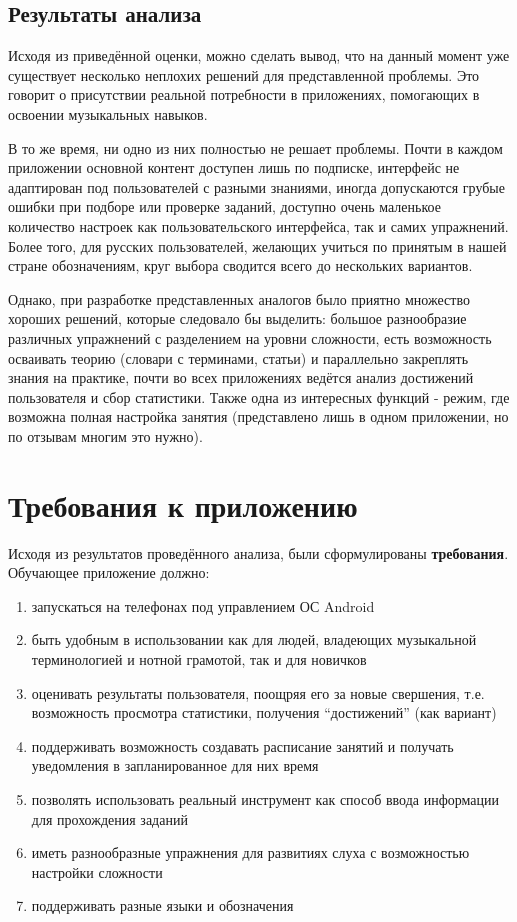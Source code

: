 \subsection{Результаты анализа}
Исходя из приведённой оценки, можно сделать вывод, что на данный момент уже существует несколько неплохих решений для представленной проблемы. Это говорит о присутствии реальной потребности в приложениях, помогающих в освоении музыкальных навыков.\par
В то же время, ни одно из них полностью не решает проблемы. Почти в каждом приложении основной контент доступен лишь по подписке, интерфейс не адаптирован под пользователей с разными знаниями, иногда допускаются грубые ошибки при подборе или проверке заданий, доступно очень маленькое количество настроек как пользовательского интерфейса, так и самих упражнений. Более того, для русских пользователей, желающих учиться по принятым в нашей стране обозначениям, круг выбора сводится всего до нескольких вариантов.\par
Однако, при разработке представленных аналогов было приятно множество хороших решений, которые следовало бы выделить: большое разнообразие различных упражнений с разделением на уровни сложности, есть возможность осваивать теорию (словари с терминами, статьи) и параллельно закреплять знания на практике, почти во всех приложениях ведётся анализ достижений пользователя и сбор статистики. Также одна из интересных функций - режим, где возможна полная настройка занятия (представлено лишь в одном приложении, но по отзывам многим это нужно).
\section{Требования к приложению}
Исходя из результатов проведённого анализа, были сформулированы \textbf{требования}. Обучающее приложение должно: 
\begin{enumerate}
\item запускаться на телефонах под управлением ОС Android
\item быть удобным в использовании как для людей, владеющих музыкальной терминологией и нотной грамотой, так и для новичков
\item оценивать результаты пользователя, поощряя его за новые свершения, т.е. возможность просмотра статистики, получения “достижений” (как вариант)
\item поддерживать возможность создавать расписание занятий и получать уведомления в запланированное для них время
\item позволять использовать реальный инструмент как способ ввода информации для прохождения заданий
\item иметь разнообразные упражнения для развитиях слуха с возможностью настройки сложности 
\item поддерживать разные языки и обозначения
\end{enumerate}\par

